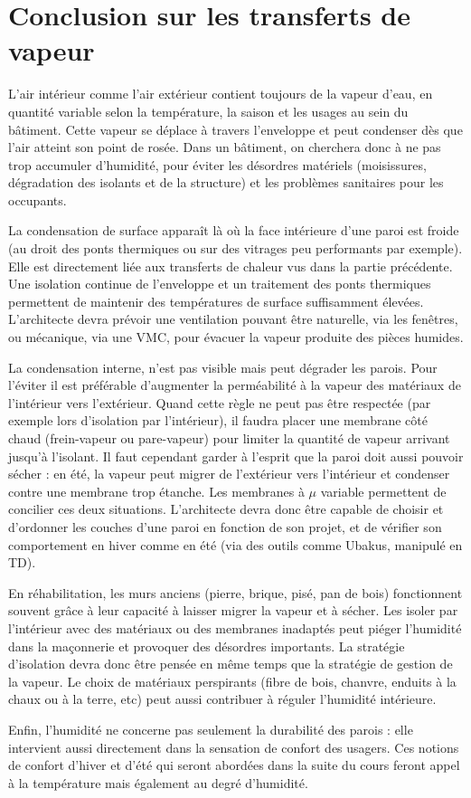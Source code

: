 \chapter{Conclusion sur les transferts de vapeur}

L’air intérieur comme l’air extérieur contient toujours de la vapeur d’eau, en quantité variable selon la température, la saison et les usages au sein du bâtiment. Cette vapeur se déplace à travers l’enveloppe et peut condenser dès que l’air atteint son point de rosée. Dans un bâtiment, on cherchera donc à ne pas trop accumuler d’humidité, pour éviter les désordres matériels (moisissures, dégradation des isolants et de la structure) et les problèmes sanitaires pour les occupants.

La condensation de surface apparaît là où la face intérieure d’une paroi est froide (au droit des ponts thermiques ou sur des vitrages peu performants par exemple). Elle est directement liée aux transferts de chaleur vus dans la partie précédente. Une isolation continue de l’enveloppe et un traitement des ponts thermiques permettent de maintenir des températures de surface suffisamment élevées. L’architecte devra prévoir une ventilation pouvant être naturelle, via les fenêtres, ou mécanique, via une VMC, pour évacuer la vapeur produite des pièces humides.

La condensation interne, n’est pas visible mais peut dégrader les parois. Pour l’éviter il est préférable d'augmenter la perméabilité à la vapeur des matériaux de l’intérieur vers l’extérieur. Quand cette règle ne peut pas être respectée (par exemple lors d’isolation par l’intérieur), il faudra placer une membrane côté chaud (frein-vapeur ou pare-vapeur) pour limiter la quantité de vapeur arrivant jusqu’à l’isolant. Il faut cependant garder à l’esprit que la paroi doit aussi pouvoir sécher : en été, la vapeur peut migrer de l’extérieur vers l’intérieur et condenser contre une membrane trop étanche. Les membranes à $\mu$ variable permettent de concilier ces deux situations. L’architecte devra donc être capable de choisir et d’ordonner les couches d’une paroi en fonction de son projet, et de vérifier son comportement en hiver comme en été (via des outils comme Ubakus, manipulé en TD).

En réhabilitation, les murs anciens (pierre, brique, pisé, pan de bois) fonctionnent souvent grâce à leur capacité à laisser migrer la vapeur et à sécher. Les isoler par l’intérieur avec des matériaux ou des membranes inadaptés peut piéger l’humidité dans la maçonnerie et provoquer des désordres importants. La stratégie d’isolation devra donc être pensée en même temps que la stratégie de gestion de la vapeur. Le choix de matériaux perspirants (fibre de bois, chanvre, enduits à la chaux ou à la terre, etc) peut aussi contribuer à réguler l’humidité intérieure.

Enfin, l’humidité ne concerne pas seulement la durabilité des parois : elle intervient aussi directement dans la sensation de confort des usagers. Ces notions de confort d’hiver et d’été qui seront abordées dans la suite du cours feront appel à la température mais également au degré d’humidité.